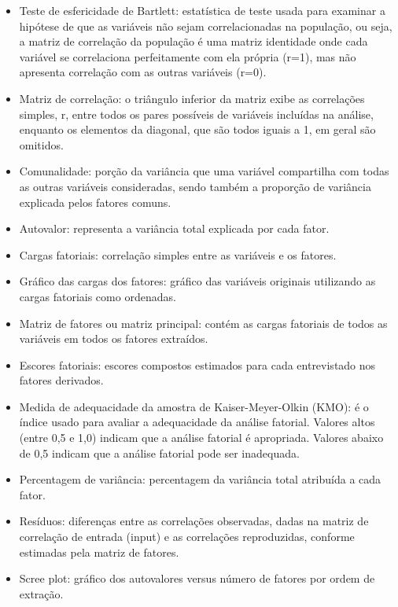 \documentclass[12pt,brazil,]{book}
\begin{document}
\begin{itemize}
\item
  Teste de esfericidade de Bartlett: estatística de teste usada para
  examinar a hipótese de que as variáveis não sejam correlacionadas na
  população, ou seja, a matriz de correlação da população é uma matriz
  identidade onde cada variável se correlaciona perfeitamente com ela
  própria (r=1), mas não apresenta correlação com as outras variáveis
  (r=0).
\item
  Matriz de correlação: o triângulo inferior da matriz exibe as
  correlações simples, r, entre todos os pares possíveis de variáveis
  incluídas na análise, enquanto os elementos da diagonal, que são todos
  iguais a 1, em geral são omitidos.
\item
  Comunalidade: porção da variância que uma variável compartilha com
  todas as outras variáveis consideradas, sendo também a proporção de
  variância explicada pelos fatores comuns.
\item
  Autovalor: representa a variância total explicada por cada fator.
\item
  Cargas fatoriais: correlação simples entre as variáveis e os fatores.
\item
  Gráfico das cargas dos fatores: gráfico das variáveis originais
  utilizando as cargas fatoriais como ordenadas.
\item
  Matriz de fatores ou matriz principal: contém as cargas fatoriais de
  todos as variáveis em todos os fatores extraídos.
\item
  Escores fatoriais: escores compostos estimados para cada entrevistado
  nos fatores derivados.
\item
  Medida de adequacidade da amostra de Kaiser-Meyer-Olkin (KMO): é o
  índice usado para avaliar a adequacidade da análise fatorial. Valores
  altos (entre 0,5 e 1,0) indicam que a análise fatorial é apropriada.
  Valores abaixo de 0,5 indicam que a análise fatorial pode ser
  inadequada.
\item
  Percentagem de variância: percentagem da variância total atribuída a
  cada fator.
\item
  Resíduos: diferenças entre as correlações observadas, dadas na matriz
  de correlação de entrada (input) e as correlações reproduzidas,
  conforme estimadas pela matriz de fatores.
\item
  Scree plot: gráfico dos autovalores versus número de fatores por ordem
  de extração.
\end{itemize}
\end{document}
